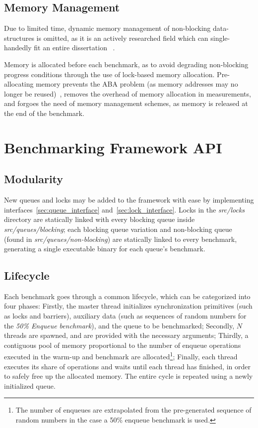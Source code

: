 \subsection{Memory Management}
Due to limited time, dynamic memory management of non-blocking data-structures
is omitted, as it is an actively researched field which can single-handedly fit
an entire dissertation ~\citep{valois1995datastructures,michael2004hazard}.

Memory is allocated before each benchmark, as to avoid degrading
non-blocking progress conditions through the use of lock-based memory
allocation. Pre-allocating memory prevents the ABA problem (as memory addresses
may no longer be reused)~\citep{dechev2010understanding}, removes the overhead
of memory allocation in measurements, and forgoes the need of memory management
schemes, as memory is released at the end of the benchmark.

\section{Benchmarking Framework API}
\subsection{Modularity}
New queues and locks may be added to the framework with ease by implementing
interfaces~\ref{sec:queue_interface} and~\ref{sec:lock_interface}. Locks in the
\emph{src/locks} directory are statically linked with every blocking queue
inside \emph{src/queues/blocking}; each blocking
queue variation and non-blocking queue (found in
\emph{src/queues/non-blocking}) are statically linked to every benchmark,
generating a single executable binary for each queue's benchmark. 

\subsection{Lifecycle}
Each benchmark goes through a common lifecycle, which can be categorized into
four phases: 
Firstly, the master thread initializes synchronization primitives
(such as locks and barriers), auxiliary data (such as
sequences of random numbers for the \emph{50\% Enqueue benchmark}), and the
queue to be benchmarked; 
Secondly, $N$ threads are spawned, and are provided
with the necessary arguments;
Thirdly, a contiguous pool of memory proportional
to the number of enqueue operations executed in the warm-up and benchmark are
allocated\footnote{The number of enqueues are extrapolated from the
pre-generated sequence of random numbers in the case a 50\% enqueue benchmark
is used.};
Finally, each thread executes its share of operations and waits until each
thread has finished, in order to safely free up the allocated memory. The
entire cycle is repeated using a newly initialized queue.

